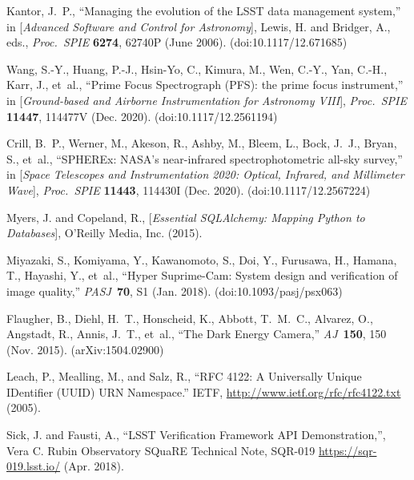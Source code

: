 \documentclass[]{spie}
\newcommand{\aj}{AJ}
\newcommand{\pasj}{PASJ}
\begin{document}
\begin{thebibliography}{10}
  {Kantor}, J.~P., ``{Managing the evolution of the LSST data management
    system},'' in [{\em Advanced Software and Control for
    Astronomy}{\nolinebreak\hspace{0.1em}]},  Lewis, H. and Bridger, A., eds.,
    {\em Proc.\ SPIE} {\bf 6274},  62740P (June 2006).
    (doi:10.1117/12.671685)

  {Wang}, S.-Y., {Huang}, P.-J., Hsin-Yo, C., {Kimura}, M., {Wen}, C.-Y., {Yan},
    C.-H., {Karr}, J., et~al., ``{Prime Focus Spectrograph (PFS): the prime focus
    instrument},'' in [{\em Ground-based and Airborne Instrumentation for
    Astronomy VIII}{\nolinebreak\hspace{0.1em}]},  {\em Proc.\ SPIE} {\bf 11447},
     114477V (Dec. 2020). (doi:10.1117/12.2561194)

  {Crill}, B.~P., {Werner}, M., {Akeson}, R., {Ashby}, M., {Bleem}, L., {Bock},
    J.~J., {Bryan}, S., et~al., ``{SPHEREx: NASA's near-infrared
    spectrophotometric all-sky survey},'' in [{\em Space Telescopes and
    Instrumentation 2020: Optical, Infrared, and Millimeter
    Wave}{\nolinebreak\hspace{0.1em}]},  {\em Proc.\ SPIE} {\bf 11443},  114430I
    (Dec. 2020). (doi:10.1117/12.2567224)

  Myers, J. and Copeland, R.,  [{\em {Essential SQLAlchemy: Mapping Python to
    Databases}}{\nolinebreak\hspace{0.1em}]}, O'Reilly Media, Inc. (2015).

  {Miyazaki}, S., {Komiyama}, Y., {Kawanomoto}, S., {Doi}, Y., {Furusawa}, H.,
    {Hamana}, T., {Hayashi}, Y., et~al., ``{Hyper Suprime-Cam: System design and
    verification of image quality},'' {\em \pasj}~{\bf 70},  S1 (Jan. 2018).
    (doi:10.1093/pasj/psx063)

  {Flaugher}, B., {Diehl}, H.~T., {Honscheid}, K., {Abbott}, T.~M.~C., {Alvarez},
    O., {Angstadt}, R., {Annis}, J.~T., et~al., ``{The Dark Energy Camera},''
    {\em \aj}~{\bf 150},  150 (Nov. 2015). (arXiv:1504.02900)

  Leach, P., Mealling, M., and Salz, R., ``{RFC 4122: A Universally Unique
    IDentifier (UUID) URN Namespace}.'' IETF,
    \url{http://www.ietf.org/rfc/rfc4122.txt} (2005).

  Sick, J. and Fausti, A., ``{LSST Verification Framework API Demonstration},'',
    Vera C. Rubin Observatory SQuaRE Technical Note, SQR-019
    \url{https://sqr-019.lsst.io/} (Apr. 2018).


\end{thebibliography}
\end{document}

